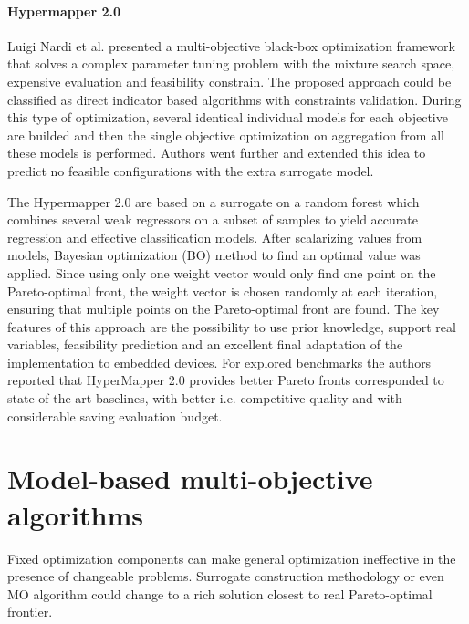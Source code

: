         \paragraph{Hypermapper 2.0} Luigi Nardi et al. \cite{nardi2019practical} presented a multi-objective black-box optimization framework that solves a complex parameter tuning problem with the mixture search space, expensive evaluation and feasibility constrain.
        The proposed approach could be classified as direct indicator based algorithms with constraints validation. During this type of optimization, several identical individual models for each objective are builded and then the single objective optimization on aggregation from all these models is performed. Authors went further and extended this idea to predict no feasible configurations with the extra surrogate model.
        
        The Hypermapper 2.0 are based on a surrogate on a random forest which combines several weak regressors on a subset of samples to yield accurate regression and effective classification models. After scalarizing values from models, Bayesian optimization (BO) method to find an optimal value was applied. Since using only one weight vector would only find one point on the Pareto-optimal front, the weight vector is chosen randomly at each iteration, ensuring that multiple points on the Pareto-optimal front are found. The key features of this approach are the possibility to use prior knowledge, support real variables, feasibility prediction and an excellent final adaptation of the implementation to embedded devices. For explored benchmarks the authors reported that HyperMapper 2.0 provides better Pareto fronts corresponded to state-of-the-art baselines, with better i.e. competitive quality and with considerable saving evaluation budget.
        

    \section{Model-based multi-objective algorithms}
        Fixed optimization components can make general optimization ineffective in the presence of changeable problems. Surrogate construction methodology or even MO algorithm could change to a rich solution closest to real Pareto-optimal frontier.


